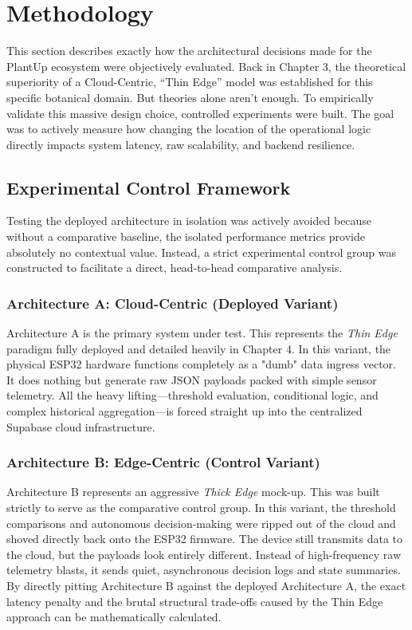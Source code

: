 \section{Methodology}

This section describes exactly how the architectural decisions made for the PlantUp ecosystem were objectively evaluated. Back in Chapter 3, the theoretical superiority of a Cloud-Centric, ``Thin Edge'' model was established for this specific botanical domain. But theories alone aren't enough. To empirically validate this massive design choice, controlled experiments were built. The goal was to actively measure how changing the location of the operational logic directly impacts system latency, raw scalability, and backend resilience.

\subsection{Experimental Control Framework}

Testing the deployed architecture in isolation was actively avoided because without a comparative baseline, the isolated performance metrics provide absolutely no contextual value. Instead, a strict experimental control group was constructed to facilitate a direct, head-to-head comparative analysis.

\subsubsection{Architecture A: Cloud-Centric (Deployed Variant)}
Architecture A is the primary system under test. This represents the \textit{Thin Edge} paradigm fully deployed and detailed heavily in Chapter 4. In this variant, the physical ESP32 hardware functions completely as a "dumb" data ingress vector. It does nothing but generate raw JSON payloads packed with simple sensor telemetry. All the heavy lifting—threshold evaluation, conditional logic, and complex historical aggregation—is forced straight up into the centralized Supabase cloud infrastructure.

\subsubsection{Architecture B: Edge-Centric (Control Variant)}
Architecture B represents an aggressive \textit{Thick Edge} mock-up. This was built strictly to serve as the comparative control group. In this variant, the threshold comparisons and autonomous decision-making were ripped out of the cloud and shoved directly back onto the ESP32 firmware. The device still transmits data to the cloud, but the payloads look entirely different. Instead of high-frequency raw telemetry blasts, it sends quiet, asynchronous decision logs and state summaries. By directly pitting Architecture B against the deployed Architecture A, the exact latency penalty and the brutal structural trade-offs caused by the Thin Edge approach can be mathematically calculated.

